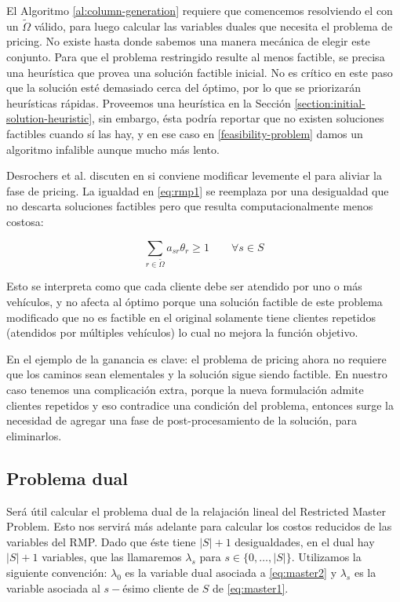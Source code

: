 El Algoritmo \ref{al:column-generation} requiere que comencemos resolviendo el  con un $\tilde{\Omega}$ válido, para luego calcular las variables duales que necesita el problema de pricing. No existe hasta donde sabemos una manera mecánica de elegir este conjunto. Para que el problema restringido resulte al menos factible, se precisa una heurística que provea una solución factible inicial. No es crítico en este paso que la solución esté demasiado cerca del óptimo, por lo que se priorizarán heurísticas rápidas. Proveemos una heurística en la Sección \ref{section:initial-solution-heuristic}, sin embargo, ésta podría reportar que no existen soluciones factibles cuando sí las hay, y en ese caso en \ref{feasibility-problem} damos un algoritmo infalible aunque mucho más lento.

Desrochers et al. discuten en \cite{desrochers1992} si conviene modificar levemente el  para aliviar la fase de pricing. La igualdad en \ref{eq:rmp1} se reemplaza por una desigualdad que no descarta soluciones factibles pero que resulta computacionalmente menos costosa:

\begin{equation}
\label{eq:ge-restriction-rmp}
     \sum_{r \in \tilde{\Omega}} {a_{sr}\theta_r} \geq 1
\qquad \forall {s \in S}
\end{equation}

Esto se interpreta como que cada cliente debe ser atendido por uno o más vehículos, y no afecta al óptimo porque una solución factible de este problema modificado que no es factible en el original solamente tiene clientes repetidos (atendidos por múltiples vehículos) lo cual no mejora la función objetivo. 

En el ejemplo de \cite{desrochers1992} la ganancia es clave: el problema de pricing ahora no requiere que los caminos sean elementales y la solución sigue siendo factible. En nuestro caso tenemos una complicación extra, porque la nueva formulación admite clientes repetidos y eso contradice una condición del problema, entonces surge la necesidad de agregar una fase de post-procesamiento de la solución, para eliminarlos.


\subsection{Problema dual}

Será útil calcular el problema dual de la relajación lineal del Restricted Master Problem. Esto nos servirá más adelante para calcular los costos reducidos de las variables del RMP. 
Dado que éste tiene $|S| + 1$ desigualdades, en el dual hay $|S| + 1$ variables, que las llamaremos $\lambda_s$ para $s \in \{0, \dots, |S|\}$. Utilizamos la siguiente convención: $\lambda_0$ es la variable dual asociada a \ref{eq:master2} y $\lambda_{s}$ es la variable asociada al $s-$ésimo cliente de $S$ de \ref{eq:master1}.
\\


